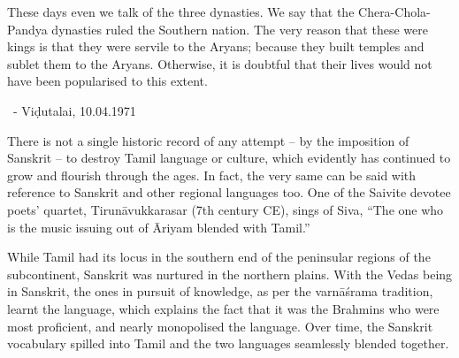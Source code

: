 \begin{myquote}
These days even we talk of the three dynasties. We say that the Chera-Chola-Pandya dynasties ruled the Southern nation. The very reason that these were kings is that they were servile to the Aryans; because they built temples and sublet them to the Aryans. Otherwise, it is doubtful that their lives would not have been popularised to this extent.

~\hfill - Viḍutalai, 10.04.1971
\end{myquote}

There is not a single historic record of any attempt – by the imposition of Sanskrit – to destroy Tamil language or culture, which evidently has continued to grow and flourish through the ages. In fact, the very same can be said with reference to Sanskrit and other regional languages too. One of the Saivite devotee poets’ quartet, Tirunāvukkarasar (7th century CE), sings of Siva, “The one who is the music issuing out of Āriyam blended with Tamil.”

While Tamil had its locus in the southern end of the peninsular regions of the subcontinent, Sanskrit was nurtured in the northern plains. With the Vedas being in Sanskrit, the ones in pursuit of knowledge, as per the varnāśrama tradition, learnt the language, which explains the fact that it was the Brahmins who were most proficient, and nearly monopolised the language. Over time, the Sanskrit vocabulary spilled into Tamil and the two languages seamlessly blended together.

